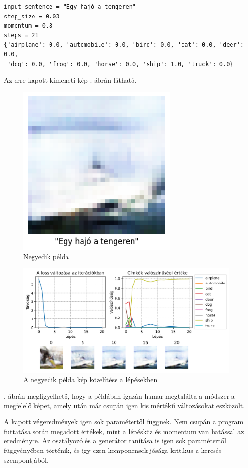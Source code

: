 \newpage


\begin{verbatim}
input_sentence = "Egy hajó a tengeren"
step_size = 0.03
momentum = 0.8
steps = 21
{'airplane': 0.0, 'automobile': 0.0, 'bird': 0.0, 'cat': 0.0, 'deer': 0.0,
 'dog': 0.0, 'frog': 0.0, 'horse': 0.0, 'ship': 1.0, 'truck': 0.0}
\end{verbatim}

Az erre kapott kimeneti kép . ábrán látható.

\begin{figure}[h!]
	\centering
	\includegraphics[width=8cm]{images/demo04.png}
	\caption{Negyedik példa}
	\label{fig:demo4}
\end{figure}

\begin{figure}[h!]
	\centering
	\includegraphics[width=\textwidth]{images/demo04_conv.png}
	\caption{A negyedik példa kép közelítése a lépésekben}
	\label{fig:demo4_convergence}
\end{figure}

. ábrán megfigyelhető, hogy a példában igazán hamar megtalálta a módszer a megfelelő képet, amely után már csupán igen kis mértékű változásokat eszközölt.

A kapott végeredmények igen sok paramétertől függnek. Nem csupán a program futtatása során megadott értékek, mint a lépésköz és momentum van hatással az eredményre. Az osztályozó és a generátor tanítása is igen sok paramétertől függvényében történik, és így ezen komponensek jósága kritikus a keresés szempontjából.

